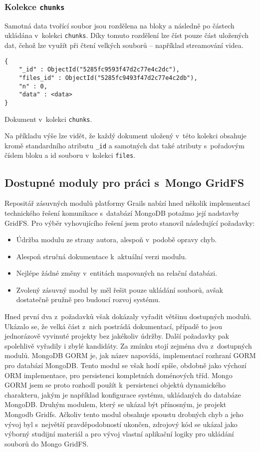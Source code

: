 \subsubsection{\textbf{Kolekce \texttt{chunks}}}
Samotná data tvořící soubor jsou rozdělena na bloky a následně po částech ukládána v~kolekci \texttt{chunks}. Díky tomuto rozdělení lze číst  pouze část uložených dat, čehož lze využít při čtení velkých souborů -- například streamování videa.
\begin{example}
    \centering
    \begin{lstlisting}
{
    "_id" : ObjectId("5285fc9593f47d2c77e4c2dc"),
    "files_id" : ObjectId("5285fc9493f47d2c77e4c2db"),
    "n" : 0,
    "data" : <data>
}
    \end{lstlisting}
    \caption{Dokument v~kolekci \texttt{chunks}.}
\end{example}
Na příkladu výše lze vidět, že každý dokument uložený v~této kolekci obsahuje kromě standardního atributu \texttt{\_id} a samotných dat také atributy s~pořadovým číslem bloku a id  souboru v~kolekci \texttt{files}.

\subsection{Dostupné moduly pro práci s~Mongo GridFS}
Repositář zásuvných modulů platformy Grails nabízí hned několik implementací technického řešení komunikace s~databází MongoDB potažmo její nadstavby GridFS. Pro výběr vyhovujícího řešení jsem proto stanovil následující požadavky:

\begin{itemize}
\item Údržba modulu ze strany autora, alespoň v~podobě opravy chyb.
\item Alespoň stručná dokumentace k~aktuální verzi modulu.
\item Nejlépe žádné změny v~entitách mapovaných na relační databázi.
\item Zvolený zásuvný modul by měl řešit pouze ukládání souborů, avšak dostatečně pružně pro budoucí rozvoj systému.
\end{itemize}

Hned první dva z~požadavků však dokázaly vyřadit většinu dostupných modulů. Ukázalo se, že velká část z~nich postrádá dokumentací, případě  to jsou jednorázově vyvinuté projekty bez jakékoliv údržby. Další požadavky pak spolehlivě vyřadily i zbylé kandidáty. Za zmínku stojí zejména dva z~dostupných modulů. MongoDB GORM je, jak název napovídá, implementací rozhraní GORM pro databází MongoDB. Tento modul se však hodí spíše, obdobně jako výchozí ORM implementace, pro persistenci kompletních doménových tříd. Mongo GORM jsem se proto rozhodl použít k~persistenci objektů dynamického charakteru, jakým je například konfigurace systému, ukládaných do databáze MongoDB. Druhým modulem, který se ukázal být přínosným, je projekt Mongodb Gridfs. Ačkoliv tento modul obsahuje spoustu drobných chyb a jeho vývoj byl s~největší pravděpodobností ukončen, zdrojový kód se ukázal jako výborný studijní materiál a pro vývoj vlastní aplikační logiky pro ukládání souborů do Mongo GridFS.
